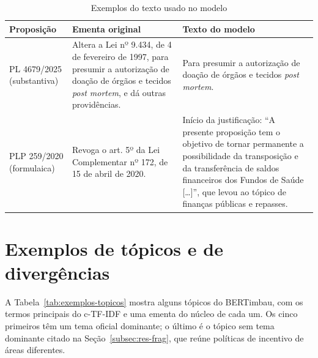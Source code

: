 \documentclass[12pt]{article}
\newcommand{\tabfont}{\fontsize{9}{11}\selectfont\setlength{\tabcolsep}{2.5pt}}
\begin{document}
\begin{table}[H]
\centering
\caption{Exemplos do texto usado no modelo}
\label{tab:texto-modelo}
\tabfont
\begin{tabularx}{\textwidth}{>{\raggedright\arraybackslash}p{2.0cm} >{\raggedright\arraybackslash}X >{\raggedright\arraybackslash}X}
\toprule
\textbf{Proposição} & \textbf{Ementa original} & \textbf{Texto do modelo} \\
\midrule
PL 4679/2025 (substantiva) & Altera a Lei nº 9.434, de 4 de fevereiro de 1997, para presumir a autorização de doação de órgãos e tecidos \textit{post mortem}, e dá outras providências. & Para presumir a autorização de doação de órgãos e tecidos \textit{post mortem}. \\
\midrule
PLP 259/2020 (formulaica) & Revoga o art. 5º da Lei Complementar nº 172, de 15 de abril de 2020. & Início da justificação: ``A presente proposição tem o objetivo de tornar permanente a possibilidade da transposição e da transferência de saldos financeiros dos Fundos de Saúde [\ldots]'', que levou ao tópico de finanças públicas e repasses. \\
\bottomrule
\end{tabularx}
\end{table}

\clearpage
\section{Exemplos de tópicos e de divergências}
\label{app:exemplos}

A Tabela~\ref{tab:exemplos-topicos} mostra alguns tópicos do BERTimbau, com os termos principais do c-TF-IDF e uma ementa do núcleo de cada um. Os cinco primeiros têm um tema oficial dominante; o último é o tópico sem tema dominante citado na Seção~\ref{subsec:res-frag}, que reúne políticas de incentivo de áreas diferentes.
\end{document}
